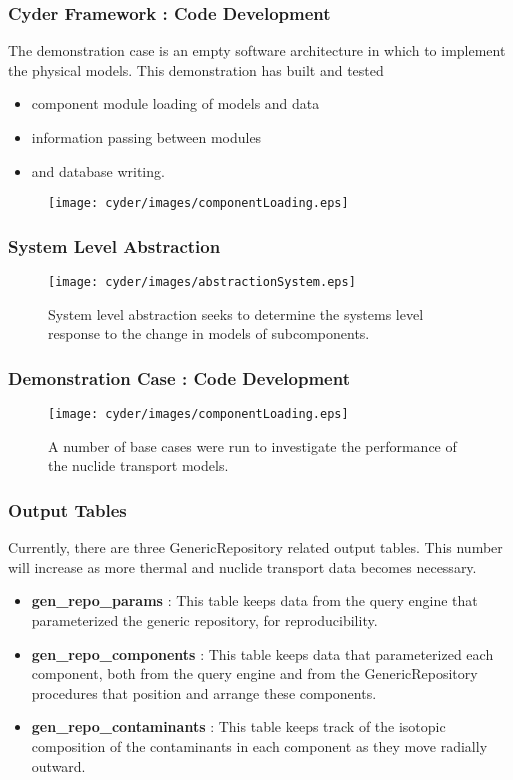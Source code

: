 
\begin{frame}[ctb!]
  \frametitle{Cyder Framework : Code Development}
  \footnotesize{
  The demonstration case is an empty software architecture in which to implement 
  the physical models. This demonstration has built and tested
  \begin{itemize}
    \item component module loading of models and data
    \item information passing between modules
    \item and database writing.
  \end{itemize}
  }
  \begin{figure}[htbp!]
    \begin{center}
      \texttt{[image: cyder/images/componentLoading.eps]}
    \end{center}
  \end{figure}
\end{frame}

\begin{frame}[ctb!]
  \frametitle{System Level Abstraction}
  \begin{figure}[h!]
      \texttt{[image: cyder/images/abstractionSystem.eps]}
    \caption{System level abstraction seeks to determine the systems level 
    response to the change in models of subcomponents.}
  \end{figure}
\end{frame}

\begin{frame}[ctb!]
  \frametitle{Demonstration Case : Code Development}
  \begin{figure}[htbp!]
    \begin{center}
      \texttt{[image: cyder/images/componentLoading.eps]}
      \caption{A number of base cases were run to investigate the performance of 
      the nuclide transport models.}
    \end{center}
  \end{figure}
\end{frame}


\begin{frame}
  \frametitle{Output Tables}
  Currently, there are three GenericRepository related output tables. This 
  number will increase as more thermal and  nuclide transport data becomes 
  necessary.

  \begin{itemize}
  \item \textbf{gen\_repo\_params} : This table keeps data from the query engine 
    that parameterized the generic repository, for reproducibility.
  \item \textbf{gen\_repo\_components} : This table keeps data that 
    parameterized each component, both from the query engine and from the 
    GenericRepository procedures that position and arrange these components. 
  \item \textbf{gen\_repo\_contaminants} : This table keeps track of the 
    isotopic composition of the contaminants in each component as they move 
    radially outward. 
\end{itemize}
\end{frame}


